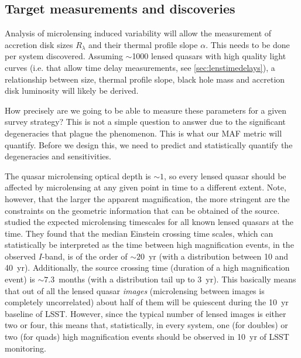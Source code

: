 \subsection{Target measurements and discoveries}
\label{sec:\secname:targets}

Analysis of microlensing induced variability will allow the measurement of
accretion disk sizes $R_\lambda$ and their thermal profile slope $\alpha$. This
needs to be done per system discovered. Assuming $\sim$1000 lensed quasars with
high quality light curves (i.e. that allow time delay measurements, see
\autoref{sec:lenstimedelays}), a relationship between size, thermal profile
slope, black hole mass and accretion disk luminosity will likely be derived.

How precisely are we going to be able to measure these parameters for a given
survey strategy? This is not a simple question to answer due to the significant
degeneracies that plague the phenomenon. This is what our MAF metric will
quantify. Before we design this, we need to predict and statistically quantify
the degeneracies and sensitivities.


The quasar microlensing optical depth is $\sim1$, so every lensed quasar should
be affected by microlensing at any given point in time to a different extent.
Note, however, that the larger the apparent magnification, the more stringent are
the constraints on the geometric information that can be obtained of the source.
\citet{MosqueraandKochanek2011} studied the expected microlensing
timescales for all known lensed quasars at the time. They found that the median
Einstein crossing time scales, which can statistically be interpreted as the
time between high magnification events, in the observed $I$-band, is of the order
of $\sim20$~yr (with a distribution between 10 and 40~yr). Additionally, the source
crossing time (duration of a high magnification event) is $\sim7.3$~months (with
a distribution tail up to 3~yr). This basically means that out of all the lensed
quasar {\em images} (microlensing between images is completely uncorrelated)
about half of them will be quiescent during the 10~yr baseline of LSST. However,
since the typical number of lensed images is either two or four, this means
that, statistically, in every system, one (for doubles) or two (for quads) high
magnification events should be observed in 10~yr of LSST monitoring.

